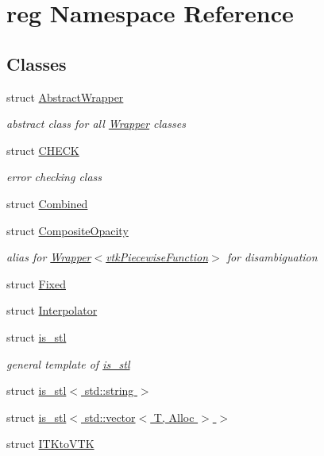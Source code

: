 \hypertarget{namespacereg}{}\section{reg Namespace Reference}
\label{namespacereg}
\subsection*{Classes}
\begin{DoxyCompactItemize}
\item 
struct \hyperlink{structreg_1_1_abstract_wrapper}{Abstract\+Wrapper}
\begin{DoxyCompactList}\small\item\em abstract class for all \hyperlink{structreg_1_1_wrapper}{Wrapper} classes \end{DoxyCompactList}\item 
struct \hyperlink{structreg_1_1_c_h_e_c_k}{C\+H\+E\+CK}
\begin{DoxyCompactList}\small\item\em error checking class \end{DoxyCompactList}\item 
struct \hyperlink{structreg_1_1_combined}{Combined}
\item 
struct \hyperlink{structreg_1_1_composite_opacity}{Composite\+Opacity}
\begin{DoxyCompactList}\small\item\em alias for \hyperlink{structreg_1_1_wrapper}{Wrapper$<$vtk\+Piecewise\+Function$>$} for disambiguation \end{DoxyCompactList}\item 
struct \hyperlink{structreg_1_1_fixed}{Fixed}
\item 
struct \hyperlink{structreg_1_1_interpolator}{Interpolator}
\item 
struct \hyperlink{structreg_1_1is__stl}{is\+\_\+stl}
\begin{DoxyCompactList}\small\item\em general template of \hyperlink{structreg_1_1is__stl}{is\+\_\+stl} \end{DoxyCompactList}\item 
struct \hyperlink{structreg_1_1is__stl_3_01std_1_1string_01_4}{is\+\_\+stl$<$ std\+::string $>$}
\item 
struct \hyperlink{structreg_1_1is__stl_3_01std_1_1vector_3_01_t_00_01_alloc_01_4_01_4}{is\+\_\+stl$<$ std\+::vector$<$ T, Alloc $>$ $>$}
\item 
struct \hyperlink{structreg_1_1_i_t_kto_v_t_k}{I\+T\+Kto\+V\+TK}

\end{DoxyCompactItemize}
